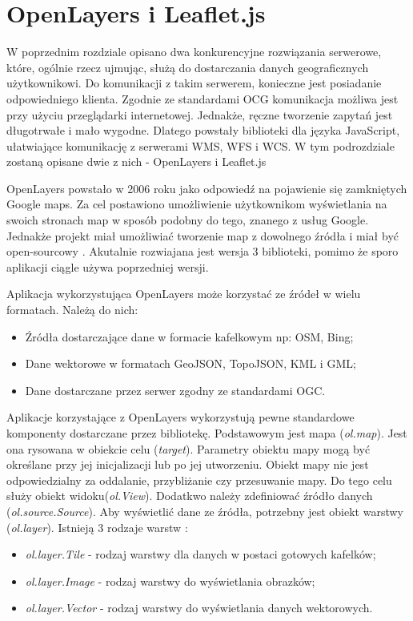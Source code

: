 \section{OpenLayers i Leaflet.js}
\label{chap:OpenLayers}

W poprzednim rozdziale opisano dwa konkurencyjne rozwiązania serwerowe, które, ogólnie rzecz ujmując, służą do dostarczania danych geograficznych użytkownikowi.
Do komunikacji z takim serwerem, konieczne jest posiadanie odpowiedniego klienta. Zgodnie ze standardami OCG \cite{OpenGIS_WMS2006,OpenGIS_WFS2010,OpenGIS_WCS2012}
komunikacja możliwa jest przy użyciu przeglądarki internetowej. Jednakże, ręczne tworzenie zapytań jest długotrwałe i mało wygodne. Dlatego powstały biblioteki
dla języka JavaScript, ułatwiające komunikację z serwerami WMS, WFS i WCS. W tym podrozdziale zostaną opisane dwie z nich - OpenLayers i Leaflet.js

OpenLayers powstało w 2006 roku jako odpowiedź na pojawienie się zamkniętych Google maps.
Za cel postawiono umożliwienie użytkownikom wyświetlania na swoich stronach map w sposób podobny do tego, znanego z usług Google.
Jednakże projekt miał umożliwiać tworzenie map z dowolnego źródła i miał być open-sourcowy \cite{website:OpenLayersHistory}.
Akutalnie rozwiajana jest wersja 3 biblioteki, pomimo że sporo aplikacji ciągle używa poprzedniej wersji.

Aplikacja wykorzystująca OpenLayers może korzystać ze źródeł w wielu formatach. Należą do nich:
\begin{itemize}
    \item Źródła dostarczające dane w formacie kafelkowym np: OSM, Bing;
    \item Dane wektorowe w formatach GeoJSON, TopoJSON, KML i GML;
    \item Dane dostarczane przez serwer zgodny ze standardami OGC.
\end{itemize}

Aplikacje korzystające z OpenLayers wykorzystują pewne standardowe komponenty dostarczane przez bibliotekę. Podstawowym jest mapa (\textit{ol.map}).
Jest ona rysowana w obiekcie celu (\textit{target}). Parametry obiektu mapy mogą być określane przy jej inicjalizacji lub po jej utworzeniu.
Obiekt mapy nie jest odpowiedzialny za oddalanie, przybliżanie czy przesuwanie mapy. Do tego celu służy obiekt widoku(\textit{ol.View}).
Dodatkwo należy zdefiniować źródło danych (\textit{ol.source.Source}).
Aby wyświetlić dane ze źródła, potrzebny jest obiekt warstwy (\textit{ol.layer}). Istnieją 3 rodzaje warstw \cite{website:OpenLayersDocumentation}:
\begin{itemize}
    \item \textit{ol.layer.Tile} - rodzaj warstwy dla danych w postaci gotowych kafelków;
    \item \textit{ol.layer.Image} - rodzaj warstwy do wyświetlania obrazków;
    \item \textit{ol.layer.Vector} - rodzaj warstwy do wyświetlania danych wektorowych.
\end{itemize}

